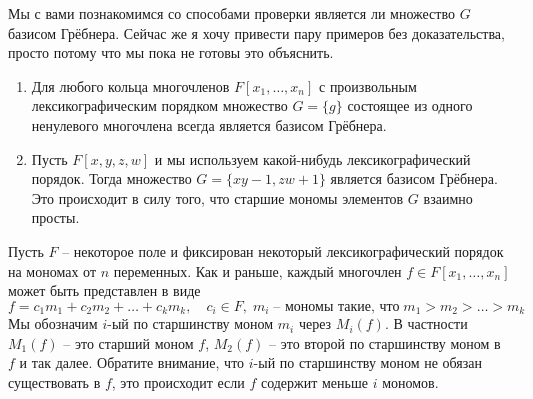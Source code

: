 \begin{examples}
Мы с вами познакомимся со способами проверки является ли множество $G$ базисом Грёбнера.
Сейчас же я хочу привести пару примеров без доказательства, просто потому что мы пока не готовы это объяснить.
\begin{enumerate}
\item Для любого кольца многочленов $F[x_1,\ldots,x_n]$ с произвольным лексикографическим порядком множество $G = \{g\}$ состоящее из одного ненулевого многочлена всегда является базисом Грёбнера.

\item Пусть $F[x,y,z,w]$ и мы используем какой-нибудь лексикографический порядок.
Тогда множество $G = \{xy - 1, zw + 1\}$ является базисом Грёбнера.
Это происходит в силу того, что старшие мономы элементов $G$ взаимно просты.
\end{enumerate}
\end{examples}

\begin{definition}
\label{def::kthLeadingTerm}
Пусть $F$ -- некоторое поле и фиксирован некоторый лексикографический порядок на мономах от $n$ переменных.
Как и раньше, каждый многочлен $f\in F[x_1,\ldots,x_n]$ может быть представлен в виде
\[
f = c_1 m_1 + c_2 m_2 + \ldots + c_k m_k,\quad c_i\in F,\;m_i\;\text{-- мономы такие, что}\; m_1 > m_2 >\ldots>m_k
\]
Мы обозначим $i$-ый по старшинству моном $m_i$ через $M_i(f)$.
В частности $M_1(f)$ -- это старший моном $f$, $M_2(f)$ -- это второй по старшинству моном в $f$ и так далее.
Обратите внимание, что $i$-ый по старшинству моном не обязан существовать в $f$, это происходит если $f$ содержит меньше $i$ мономов.
\end{definition}

